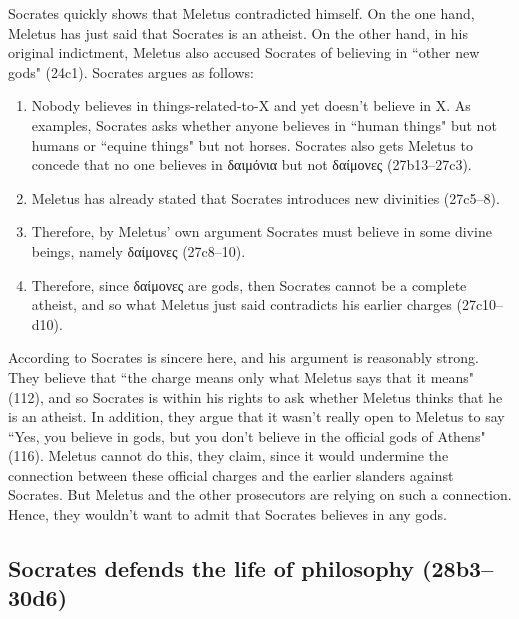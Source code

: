\documentclass[11pt]{article}
\begin{document}
Socrates quickly shows that Meletus contradicted himself.  On the one hand,
Meletus has just said that Socrates is an atheist.  On the other hand, in his
original indictment, Meletus also accused Socrates of believing in ``other new
gods" (24c1).  Socrates argues as follows:

\begin{enumerate}
    \item Nobody believes in things-related-to-X and yet doesn't believe in X.
        As examples, Socrates asks whether anyone believes in ``human things"
        but not humans or ``equine things" but not horses.  Socrates also gets
        Meletus to concede that no one believes in {\g δαιμόνια} but not
        {\g δαίμονες} (27b13--27c3).
    \item Meletus has already stated that Socrates introduces new divinities
        (27c5--8).
    \item Therefore, by Meletus' own argument Socrates must believe in some
        divine beings, namely {\g δαίμονες} (27c8--10).
    \item Therefore, since {\g δαίμονες} are gods, then Socrates cannot be
        a complete atheist, and so what Meletus just said contradicts his
        earlier charges (27c10--d10).
\end{enumerate}

According to \citeauthor{brickhouse2004} Socrates is sincere here, and his
argument is reasonably strong.  They believe that ``the charge means only what
Meletus says that it means" (112), and so Socrates is within his rights to ask
whether Meletus thinks that he is an atheist.  In addition, they argue that it
wasn't really open to Meletus to say ``Yes, you believe in gods, but you don't
believe in the official gods of Athens" (116).  Meletus cannot do this, they
claim, since it would undermine the connection between these official charges
and the earlier slanders against Socrates.  But Meletus and the other
prosecutors are relying on such a connection.  Hence, they wouldn't want to
admit that Socrates believes in any gods.



\subsection{Socrates defends the life of philosophy (28b3--30d6)}
\end{document}
